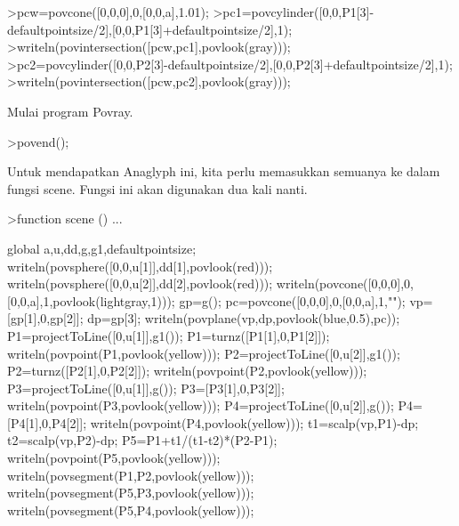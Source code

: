 \documentclass[a4paper,10pt]{article}
\begin{document}
\begin{eulernotebook}
\begin{eulercomment}
\begin{eulercomment}
\begin{eulercomment}
\begin{eulercomment}
\begin{eulercomment}
\begin{eulercomment}
\begin{eulercomment}
\begin{eulercomment}
\begin{eulercomment}
\begin{eulercomment}
\begin{eulercomment}
\begin{eulercomment}
\begin{eulercomment}
\begin{eulercomment}
\begin{eulercomment}
\begin{eulercomment}
\begin{eulercomment}
\begin{eulercomment}
\begin{eulercomment}
\begin{eulercomment}
\begin{eulercomment}
\begin{eulercomment}
\begin{eulercomment}
\begin{eulercomment}
\begin{eulercomment}
\begin{eulercomment}
\begin{eulercomment}
\begin{eulercomment}
\begin{eulercomment}
\begin{eulercomment}
\begin{eulerprompt}
>pcw=povcone([0,0,0],0,[0,0,a],1.01);
>pc1=povcylinder([0,0,P1[3]-defaultpointsize/2],[0,0,P1[3]+defaultpointsize/2],1);
>writeln(povintersection([pcw,pc1],povlook(gray)));
>pc2=povcylinder([0,0,P2[3]-defaultpointsize/2],[0,0,P2[3]+defaultpointsize/2],1);
>writeln(povintersection([pcw,pc2],povlook(gray)));
\end{eulerprompt}
\begin{eulercomment}
Mulai program Povray.
\end{eulercomment}
\begin{eulerprompt}
>povend();
\end{eulerprompt}
\begin{eulercomment}
Untuk mendapatkan Anaglyph ini, kita perlu memasukkan semuanya ke
dalam fungsi scene. Fungsi ini akan digunakan dua kali nanti.
\end{eulercomment}
\begin{eulerprompt}
>function scene () ...
\end{eulerprompt}
\begin{eulerudf}
  global a,u,dd,g,g1,defaultpointsize;
  writeln(povsphere([0,0,u[1]],dd[1],povlook(red)));
  writeln(povsphere([0,0,u[2]],dd[2],povlook(red)));
  writeln(povcone([0,0,0],0,[0,0,a],1,povlook(lightgray,1)));
  gp=g();
  pc=povcone([0,0,0],0,[0,0,a],1,"");
  vp=[gp[1],0,gp[2]]; dp=gp[3];
  writeln(povplane(vp,dp,povlook(blue,0.5),pc));
  P1=projectToLine([0,u[1]],g1()); P1=turnz([P1[1],0,P1[2]]);
  writeln(povpoint(P1,povlook(yellow)));
  P2=projectToLine([0,u[2]],g1()); P2=turnz([P2[1],0,P2[2]]);
  writeln(povpoint(P2,povlook(yellow)));
  P3=projectToLine([0,u[1]],g()); P3=[P3[1],0,P3[2]];
  writeln(povpoint(P3,povlook(yellow)));
  P4=projectToLine([0,u[2]],g()); P4=[P4[1],0,P4[2]];
  writeln(povpoint(P4,povlook(yellow)));
  t1=scalp(vp,P1)-dp; t2=scalp(vp,P2)-dp; P5=P1+t1/(t1-t2)*(P2-P1);
  writeln(povpoint(P5,povlook(yellow)));
  writeln(povsegment(P1,P2,povlook(yellow)));
  writeln(povsegment(P5,P3,povlook(yellow)));
  writeln(povsegment(P5,P4,povlook(yellow)));

\end{eulerudf}
\end{eulercomment}
\end{eulercomment}
\end{eulercomment}
\end{eulercomment}
\end{eulercomment}
\end{eulercomment}
\end{eulercomment}
\end{eulercomment}
\end{eulercomment}
\end{eulercomment}
\end{eulercomment}
\end{eulercomment}
\end{eulercomment}
\end{eulercomment}
\end{eulercomment}
\end{eulercomment}
\end{eulercomment}
\end{eulercomment}
\end{eulercomment}
\end{eulercomment}
\end{eulercomment}
\end{eulercomment}
\end{eulercomment}
\end{eulercomment}
\end{eulercomment}
\end{eulercomment}
\end{eulercomment}
\end{eulercomment}
\end{eulercomment}
\end{eulercomment}
\end{eulernotebook}
\end{document}
